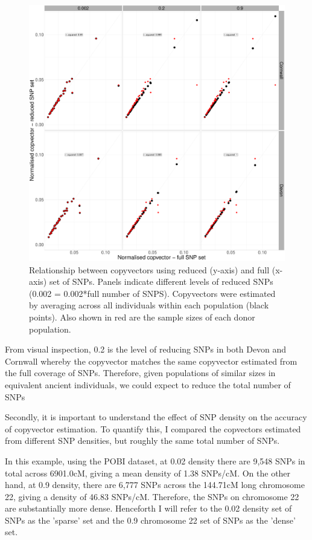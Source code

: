 \begin{figure}[htp]
    \centering
    \includegraphics[width=1.0\textwidth]{../images/chapter1/Devon_Cornwall_copyvectors_sample_size_reduced.pdf}
    \caption{Relationship between copyvectors using reduced (y-axis) and full (x-axis) set of SNPs. Panels indicate different levels of reduced SNPs (0.002 = 0.002*full number of SNPS). Copyvectors were estimated by averaging across all individuals within each population (black points). Also shown in red are the sample sizes of each donor population.}
    \label{fig:Devon_Cornwall_copyvectors_sample_size_reduced}
\end{figure}

From visual inspection, 0.2 is the level of reducing SNPs in both Devon and Cornwall whereby the copyvector matches the same copyvector estimated from the full coverage of SNPs. Therefore, given populations of similar sizes in equivalent ancient individuals, we could expect to reduce the total number of SNPs 

Secondly, it is important to understand the effect of SNP density on the accuracy of copyvector estimation. To quantify this, I compared the copvectors estimated from different SNP densities, but roughly the same total number of SNPs. 

In this example, using the POBI dataset, at 0.02 density there are 9,548 SNPs in total across 6901.0cM, giving a mean density of 1.38 SNPs/cM. On the other hand, at 0.9 density, there are 6,777 SNPs across the 144.71cM long chromosome 22, giving a density of 46.83 SNPs/cM. Therefore, the SNPs on chromosome 22 are substantially more dense. Henceforth I will refer to the 0.02 density set of SNPs as the 'sparse' set and the 0.9 chromosome 22 set of SNPs as the 'dense' set. 

